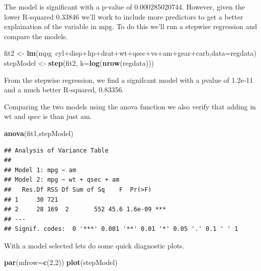 \documentclass[]{article}
\newenvironment{Shaded}{\begin{snugshade}}{\end{snugshade}}
\newcommand{\KeywordTok}[1]{\textcolor[rgb]{0.13,0.29,0.53}{\textbf{{#1}}}}
\newcommand{\DataTypeTok}[1]{\textcolor[rgb]{0.13,0.29,0.53}{{#1}}}
\newcommand{\DecValTok}[1]{\textcolor[rgb]{0.00,0.00,0.81}{{#1}}}
\newcommand{\StringTok}[1]{\textcolor[rgb]{0.31,0.60,0.02}{{#1}}}
\newcommand{\NormalTok}[1]{{#1}}
\begin{document}
The model is significant with a p-value of 0.000285020744. However,
given the lower R-squared 0.33846 we'll work to include more predictors
to get a better explaination of the variable in mpg. To do this we'll
run a stepwise regression and compare the models.

\begin{Shaded}
\begin{Highlighting}[]
\NormalTok{fit2 <-}\StringTok{ }\KeywordTok{lm}\NormalTok{(mpg~cyl+disp+hp+drat+wt+qsec+vs+am+gear+carb,}\DataTypeTok{data=}\NormalTok{regdata)}
\NormalTok{stepModel <-}\StringTok{ }\KeywordTok{step}\NormalTok{(fit2, }\DataTypeTok{k=}\KeywordTok{log}\NormalTok{(}\KeywordTok{nrow}\NormalTok{(regdata)))}
\end{Highlighting}
\end{Shaded}

From the stepwise regression, we find a signifcant model with a pvalue
of 1.2e-11 and a much better R-squared, 0.83356.

Comparing the two models using the anova function we also verify that
adding in wt and qsec is than just am.

\begin{Shaded}
\begin{Highlighting}[]
\KeywordTok{anova}\NormalTok{(fit1,stepModel)}
\end{Highlighting}
\end{Shaded}

\begin{verbatim}
## Analysis of Variance Table
## 
## Model 1: mpg ~ am
## Model 2: mpg ~ wt + qsec + am
##   Res.Df RSS Df Sum of Sq    F  Pr(>F)    
## 1     30 721                              
## 2     28 169  2       552 45.6 1.6e-09 ***
## ---
## Signif. codes:  0 '***' 0.001 '**' 0.01 '*' 0.05 '.' 0.1 ' ' 1
\end{verbatim}

With a model selected lets do some quick diagnostic plots.

\begin{Shaded}
\begin{Highlighting}[]
\KeywordTok{par}\NormalTok{(}\DataTypeTok{mfrow=}\KeywordTok{c}\NormalTok{(}\DecValTok{2}\NormalTok{,}\DecValTok{2}\NormalTok{))}
\KeywordTok{plot}\NormalTok{(stepModel)}
\end{Highlighting}
\end{Shaded}
\end{document}
